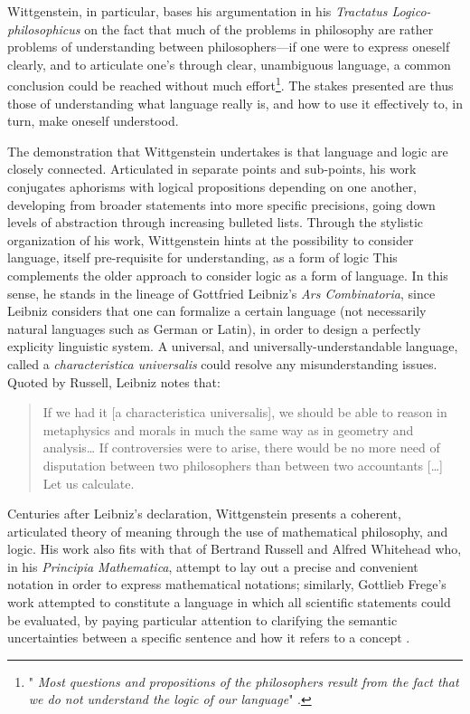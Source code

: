 Wittgenstein, in particular, bases his argumentation in his \emph{Tractatus Logico-philosophicus} on the fact that much of the problems in philosophy are rather problems of understanding between philosophers—if one were to express oneself clearly, and to articulate one's through clear, unambiguous language, a common conclusion could be reached without much effort\footnote{"\emph{    Most questions and propositions of the philosophers result from the fact that we do not understand the logic of our language}" \citep{wittgenstein_tractatus_2010}.}. The stakes presented are thus those of understanding what language really is, and how to use it effectively to, in turn, make oneself understood.

The demonstration that Wittgenstein undertakes is that language and logic are closely connected. Articulated in separate points and sub-points, his work conjugates aphorisms with logical propositions depending on one another, developing from broader statements into more specific precisions, going down levels of abstraction through increasing bulleted lists. Through the stylistic organization of his work, Wittgenstein hints at the possibility to consider language, itself pre-requisite for understanding, as a form of logic This complements the older approach to consider logic as a form of language. In this sense, he stands in the lineage of Gottfried Leibniz's \emph{Ars Combinatoria}, since Leibniz considers that one can formalize a certain language (not necessarily natural languages such as German or Latin), in order to design a perfectly explicity linguistic system. A universal, and universally-understandable language, called a \emph{characteristica universalis} could resolve any misunderstanding issues. Quoted by Russell, Leibniz notes that:

\begin{quote}
    If we had it [a characteristica universalis], we should be able to reason in metaphysics and morals in much the same way as in geometry and analysis\dots{} If controversies were to arise, there would be no more need of disputation between two philosophers than between two accountants [\dots] Let us calculate. \citep{russell_logical_1950}
\end{quote}

Centuries after Leibniz's declaration, Wittgenstein presents a coherent, articulated theory of meaning through the use of mathematical philosophy, and logic. His work also fits with that of Bertrand Russell and Alfred Whitehead who, in his \emph{Principia Mathematica}, attempt to lay out a precise and convenient notation in order to express mathematical notations; similarly, Gottlieb Frege's work attempted to constitute a language in which all scientific statements could be evaluated, by paying particular attention to clarifying the semantic uncertainties between a specific sentence and how it refers to a concept \citep{korte_frege_2010}.

